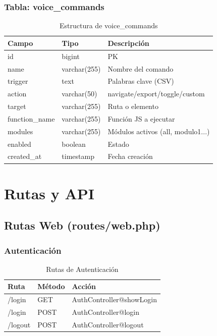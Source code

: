 \subsubsection{Tabla: voice\_commands}

\begin{table}[H]
\centering
\small
\begin{tabular}{|l|l|p{5cm}|}
\hline
\textbf{Campo} & \textbf{Tipo} & \textbf{Descripción} \\
\hline
id & bigint & PK \\
name & varchar(255) & Nombre del comando \\
trigger & text & Palabras clave (CSV) \\
action & varchar(50) & navigate/export/toggle/custom \\
target & varchar(255) & Ruta o elemento \\
function\_name & varchar(255) & Función JS a ejecutar \\
modules & varchar(255) & Módulos activos (all, modulo1...) \\
enabled & boolean & Estado \\
created\_at & timestamp & Fecha creación \\
\hline
\end{tabular}
\caption{Estructura de voice\_commands}
\end{table}

\newpage

\section{Rutas y API}

\subsection{Rutas Web (routes/web.php)}

\subsubsection{Autenticación}

\begin{table}[H]
\centering
\begin{tabular}{|l|l|l|}
\hline
\textbf{Ruta} & \textbf{Método} & \textbf{Acción} \\
\hline
/login & GET & AuthController@showLogin \\
/login & POST & AuthController@login \\
/logout & POST & AuthController@logout \\
\hline
\end{tabular}
\caption{Rutas de Autenticación}
\end{table}

